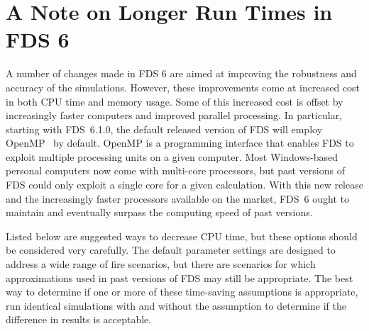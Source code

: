\documentclass[11pt]{book}
\begin{document}
\section{A Note on Longer Run Times in FDS 6}

A number of changes made in FDS 6 are aimed at improving the robustness and accuracy of the simulations. However, these improvements come at increased cost in both CPU time and memory usage. Some of this increased cost is offset by increasingly faster computers and improved parallel processing. In particular, starting with FDS~6.1.0, the default released version of FDS will employ OpenMP~\cite{Chapman:OpenMP} by default. OpenMP is a programming interface that enables FDS to exploit multiple processing units on a given computer. Most Windows-based personal computers now come with multi-core processors, but past versions of FDS could only exploit a single core for a given calculation. With this new release and the increasingly faster processors available on the market, FDS~6 ought to maintain and eventually surpass the computing speed of past versions.

Listed below are suggested ways to decrease CPU time, but these options should be considered very carefully. The default parameter settings are designed to address a wide range of fire scenarios, but there are scenarios for which approximations used in past versions of FDS may still be appropriate. The best way to determine if one or more of these time-saving assumptions is appropriate, run identical simulations with and without the assumption to determine if the difference in results is acceptable.
\end{document}
